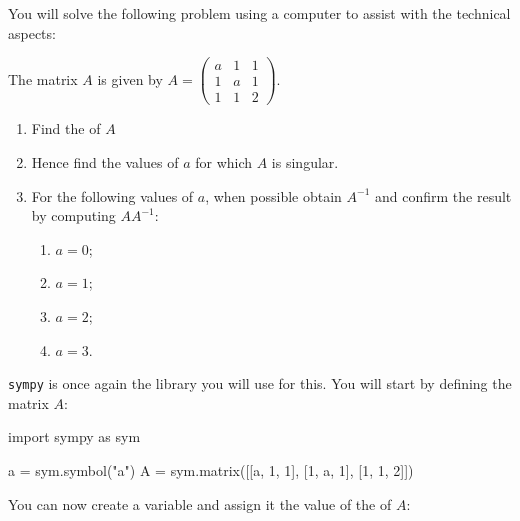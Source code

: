 You will solve the following problem using a computer to assist with the technical aspects:

The matrix \(A\) is given by \(A=\begin{pmatrix}a & 1 & 1\\ 1 & a & 1\\ 1 & 1 & 2\end{pmatrix}\).
\begin{enumerate}

\item 

Find the  of \(A\)

\item 

Hence find the values of \(a\) for which \(A\) is singular.

\item 

For the following values of \(a\), when possible obtain \(A ^ {- 1}\) and confirm
the result by computing \(AA^{-1}\):
\begin{enumerate}

\item 

\(a = 0\);

\item 

\(a = 1\);

\item 

\(a = 2\);

\item 

\(a = 3\).

\end{enumerate}

\end{enumerate}



\texttt{sympy} is once again the library you will use for this.
You will start by defining the matrix \(A\):




\begin{pyin}
import sympy as sym

a = sym.symbol("a")
A = sym.matrix([[a, 1, 1], [1, a, 1], [1, 1, 2]])
\end{pyin}





You can now create a variable \texttt{} and assign it the value of the
 of \(A\):




